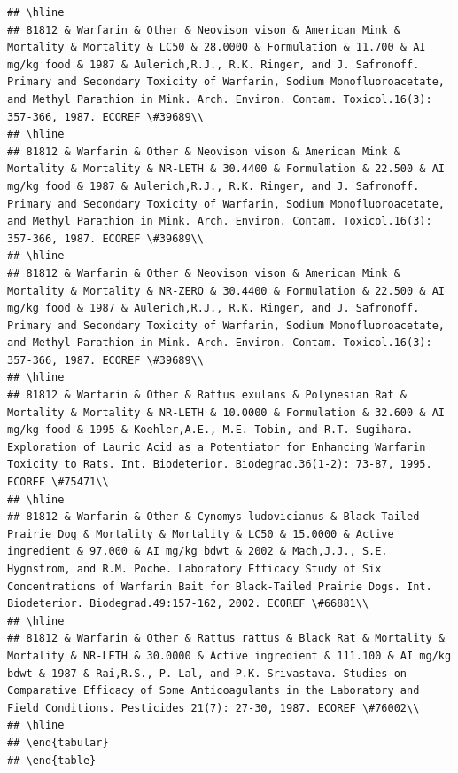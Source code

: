 \documentclass[12pt,]{article}
\begin{document}
\begin{verbatim}
## \hline
## 81812 & Warfarin & Other & Neovison vison & American Mink & Mortality & Mortality & LC50 & 28.0000 & Formulation & 11.700 & AI mg/kg food & 1987 & Aulerich,R.J., R.K. Ringer, and J. Safronoff. Primary and Secondary Toxicity of Warfarin, Sodium Monofluoroacetate, and Methyl Parathion in Mink. Arch. Environ. Contam. Toxicol.16(3): 357-366, 1987. ECOREF \#39689\\
## \hline
## 81812 & Warfarin & Other & Neovison vison & American Mink & Mortality & Mortality & NR-LETH & 30.4400 & Formulation & 22.500 & AI mg/kg food & 1987 & Aulerich,R.J., R.K. Ringer, and J. Safronoff. Primary and Secondary Toxicity of Warfarin, Sodium Monofluoroacetate, and Methyl Parathion in Mink. Arch. Environ. Contam. Toxicol.16(3): 357-366, 1987. ECOREF \#39689\\
## \hline
## 81812 & Warfarin & Other & Neovison vison & American Mink & Mortality & Mortality & NR-ZERO & 30.4400 & Formulation & 22.500 & AI mg/kg food & 1987 & Aulerich,R.J., R.K. Ringer, and J. Safronoff. Primary and Secondary Toxicity of Warfarin, Sodium Monofluoroacetate, and Methyl Parathion in Mink. Arch. Environ. Contam. Toxicol.16(3): 357-366, 1987. ECOREF \#39689\\
## \hline
## 81812 & Warfarin & Other & Rattus exulans & Polynesian Rat & Mortality & Mortality & NR-LETH & 10.0000 & Formulation & 32.600 & AI mg/kg food & 1995 & Koehler,A.E., M.E. Tobin, and R.T. Sugihara. Exploration of Lauric Acid as a Potentiator for Enhancing Warfarin Toxicity to Rats. Int. Biodeterior. Biodegrad.36(1-2): 73-87, 1995. ECOREF \#75471\\
## \hline
## 81812 & Warfarin & Other & Cynomys ludovicianus & Black-Tailed Prairie Dog & Mortality & Mortality & LC50 & 15.0000 & Active ingredient & 97.000 & AI mg/kg bdwt & 2002 & Mach,J.J., S.E. Hygnstrom, and R.M. Poche. Laboratory Efficacy Study of Six Concentrations of Warfarin Bait for Black-Tailed Prairie Dogs. Int. Biodeterior. Biodegrad.49:157-162, 2002. ECOREF \#66881\\
## \hline
## 81812 & Warfarin & Other & Rattus rattus & Black Rat & Mortality & Mortality & NR-LETH & 30.0000 & Active ingredient & 111.100 & AI mg/kg bdwt & 1987 & Rai,R.S., P. Lal, and P.K. Srivastava. Studies on Comparative Efficacy of Some Anticoagulants in the Laboratory and Field Conditions. Pesticides 21(7): 27-30, 1987. ECOREF \#76002\\
## \hline
## \end{tabular}
## \end{table}
\end{verbatim}
\end{document}
